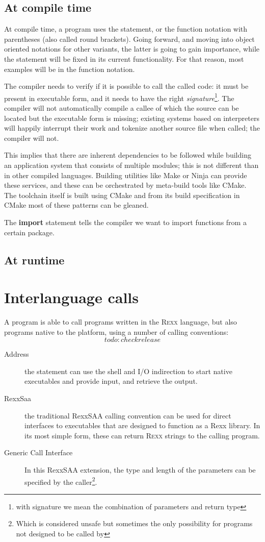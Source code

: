 \section{At compile time}
At compile time, a program uses the  statement, or the
function notation with parentheses (also called round brackets). Going
forward, and moving into object oriented notations for other \rexx{}
variants, the latter is going to gain importance, while the
 statement will be fixed in its current functionality. For
that reason, most examples will be in the function notation.

The compiler needs to verify if it is possible to call the called
code: it must be present in executable form, and it needs to have the right
\emph{signature}\footnote{with signature we mean the combination of
  parameters and return type}. The compiler will not automatically compile a callee
of which the source can be located but the executable form is missing;
existing systems based on interpreters will happily interrupt their
work and tokenize another source file when called; the \crexx{}
 compiler will not.

This implies that there are inherent dependencies to be followed
while building an application system that consists of multiple
modules; this is not different than in other compiled
languages. Building utilities like Make or Ninja can provide these
services, and these can be orchestrated by meta-build tools like
CMake. The \crexx{} toolchain itself is built using CMake and from its
build specification in CMake most of these patterns can be gleaned.

The \textbf{import} statement\label{intraImport} tells the compiler we want to
import functions from a certain package.


\section{At runtime}
\chapter{Interlanguage calls}
A \crexx{} program is able to call programs written in the \textsc{Rexx}
language, but also programs native to the platform, using a number of
calling conventions: \[todo: checkrelease\]
\begin{description}
  \item[Address] the  statement can use the shell and
    I/O indirection to start native executables and provide input, and
    retrieve the output.
    \item[RexxSaa] the traditional RexxSAA calling convention can be
      used for direct interfaces to executables that are designed to
      function as a Rexx library. In its most simple form, these can
      return \textsc{Rexx} strings to the calling program.
      \item[Generic Call Interface] In this RexxSAA extension, the
      type and length of the parameters can be specified by the
      caller\footnote{Which is considered unsafe but sometimes the
        only possibility for programs not designed to be called by \crexx{}}.
    \end{description}
